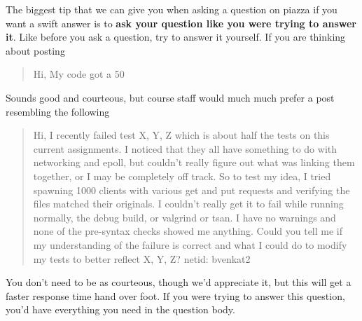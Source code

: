 The biggest tip that we can give you when asking a question on piazza if you want a swift answer is to \textbf{ask your question like you were trying to answer it}. Like before you ask a question, try to answer it yourself. If you are thinking about posting

\begin{quote}
Hi, My code got a 50%
\end{quote}

Sounds good and courteous, but course staff would much much prefer a post resembling the following

\begin{quote}
Hi, I recently failed test X, Y, Z which is about half the tests on this current assignments. I noticed that they all have something to do with networking and epoll, but couldn't really figure out what was linking them together, or I may be completely off track. So to test my idea, I tried spawning 1000 clients with various get and put requests and verifying the files matched their originals. I couldn't really get it to fail while running normally, the debug build, or valgrind or tsan. I have no warnings and none of the pre-syntax checks showed me anything. Could you tell me if my understanding of the failure is correct and what I could do to modify my tests to better reflect X, Y, Z? netid: bvenkat2
\end{quote}

You don't need to be as courteous, though we'd appreciate it, but this will get a faster response time hand over foot. If you were trying to answer this question, you'd have everything you need in the question body.




